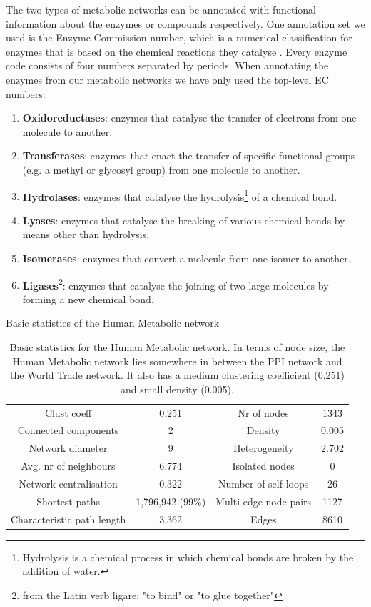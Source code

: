 The two types of metabolic networks can be annotated with functional information about the enzymes or compounds respectively. One annotation set we used is the Enzyme Commission number, which is a numerical classification for enzymes that is based on the chemical reactions they catalyse \cite{webb1992enzyme}. Every enzyme code consists of four numbers separated by periods. When annotating the enzymes from our metabolic networks we have only used the top-level EC numbers:
\begin{enumerate}
 \item \textbf{Oxidoreductases}: enzymes that catalyse the transfer of electrons from one molecule to another.
 \item \textbf{Transferases}: enzymes that enact the transfer of specific functional groups (e.g. a methyl or glycosyl group) from one molecule to another.
 \item \textbf{Hydrolases}: enzymes that catalyse the hydrolysis\footnote{Hydrolysis is a chemical process in which chemical bonds are broken by the addition of water.} of a chemical bond.
 \item \textbf{Lyases}: enzymes that catalyse the breaking of various chemical bonds by means other than hydrolysis.
 \item \textbf{Isomerases}: enzymes that convert a molecule from one isomer to another.
 \item \textbf{Ligases}\footnote{from the Latin verb ligare: "to bind" or "to glue together"}: enzymes that catalyse the joining of two large molecules by forming a new chemical bond.
\end{enumerate}


\begin{table}
  \centering
  Basic statistics of the Human Metabolic network\\
  \begin{tabular}{  c  c | c  c }
    Clust coeff & 0.251 & Nr of nodes & 1343\\
    Connected components & 2 & Density & 0.005\\ 
    Network diameter & 9 & Heterogeneity & 2.702\\
    Avg. nr of neighbours & 6.774 & Isolated nodes & 0\\
    Network centralisation & 0.322 & Number of self-loops & 26\\
    Shortest paths & 1,796,942 (99\%) & Multi-edge node pairs & 1127\\
    Characteristic path length & 3.362 & Edges & 8610\\
  \end{tabular}
  \caption{Basic statistics for the Human Metabolic network. In terms of node size, the Human Metabolic network lies somewhere in between the PPI network and the World Trade network. It also has a medium clustering coefficient (0.251) and small density (0.005). }
  \label{tab:meta_stats_table}
\end{table}



